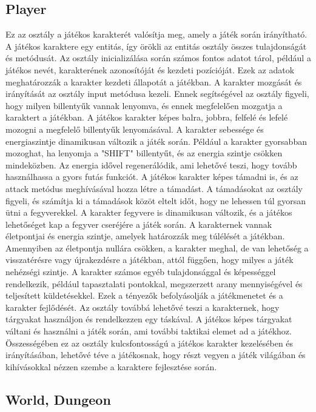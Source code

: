                     \subsection{Player}
Ez az osztály a játékos karakterét valósítja meg, amely a játék során irányítható. A játékos karaktere egy entitás, így örökli az entitás osztály összes tulajdonságát és metódusát. Az osztály inicializálása során számos fontos adatot tárol, például a játékos nevét, karakterének azonosítóját és kezdeti pozícióját. Ezek az adatok meghatározzák a karakter kezdeti állapotát a játékban. A karakter mozgását és irányítását az osztály input metódusa kezeli. Ennek segítségével az osztály figyeli, hogy milyen billentyűk vannak lenyomva, és ennek megfelelően mozgatja a karaktert a játékban. A játékos karakter képes balra, jobbra, felfelé és lefelé mozogni a megfelelő billentyűk lenyomásával. A karakter sebessége és energiaszintje dinamikusan változik a játék során. Például a karakter gyorsabban mozoghat, ha lenyomja a "SHIFT" billentyűt, és az energia szintje csökken mindeközben. Az energia idővel regenerálódik, ami lehetővé teszi, hogy tovább használhassa a gyors futás funkciót. A játékos karakter képes támadni is, és az attack metódus meghívásával hozza létre a támadást. A támadásokat az osztály figyeli, és számítja ki a támadások közöt eltelt időt, hogy ne lehessen túl gyorsan ütni a fegyverekkel. A karakter fegyvere is dinamikusan változik, és a játékos lehetőséget kap a fegyver cseréjére a játék során. A karakternek vannak életpontjai és energia szintje, amelyek határozzák meg túlélését a játékban. Amennyiben az életpontja nullára csökken, a karakter meghal, de van lehetőség a visszatérésre vagy újrakezdésre a játékban, attól függően, hogy milyes a játék nehézségi szintje. A karakter számos egyéb tulajdonsággal és képességgel rendelkezik, például tapasztalati pontokkal, megszerzett arany mennyiségével és teljesített küldetésekkel. Ezek a tényezők befolyásolják a játékmenetet és a karakter fejlődését. Az osztály továbbá lehetővé teszi a karakternek, hogy tárgyakat használjon és rendelkezzen egy táskával. A játékos képes tárgyakat váltani és használni a játék során, ami további taktikai elemet ad a játékhoz. Összességében ez az osztály kulcsfontosságú a játékos karakter kezelésében és irányításában, lehetővé téve a játékosnak, hogy részt vegyen a játék világában és kihívásokkal nézzen szembe a karaktere fejlesztése során.
\subsection{World, Dungeon}

